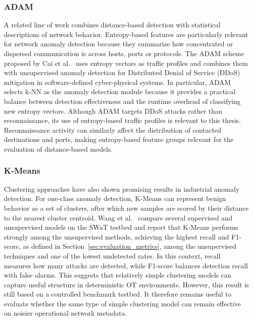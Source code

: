 \subsubsection{ADAM}
A related line of work combines distance-based detection with statistical descriptions of network behavior. Entropy-based features are particularly relevant for network anomaly detection because they summarize how concentrated or dispersed communication is across hosts, ports or protocols. The ADAM scheme proposed by Cai et al.~\cite{cai_adam_2023} uses entropy vectors as traffic profiles and combines them with unsupervised anomaly detection for Distributed Denial of Service (DDoS) mitigation in software-defined cyber-physical systems. In particular, ADAM selects k-NN as the anomaly detection module because it provides a practical balance between detection effectiveness and the runtime overhead of classifying new entropy vectors. Although ADAM targets DDoS attacks rather than reconnaissance, its use of entropy-based traffic profiles is relevant to this thesis. Reconnaissance activity can similarly affect the distribution of contacted destinations and ports, making entropy-based feature groups relevant for the evaluation of distance-based models.

\subsubsection{K-Means}
Clustering approaches have also shown promising results in industrial anomaly detection. For one-class anomaly detection, K-Means can represent benign behavior as a set of clusters, after which new samples are scored by their distance to the nearest cluster centroid. Wang et al.~\cite{wang_guardians_2026} compare several supervised and unsupervised models on the SWaT testbed and report that K-Means performs strongly among the unsupervised methods, achieving the highest recall and F1-score, as defined in Section~\ref{sec:evaluation_metrics}, among the unsupervised techniques and one of the lowest undetected rates. In this context, recall measures how many attacks are detected, while F1-score balances detection recall with false alarms. This suggests that relatively simple clustering models can capture useful structure in deterministic OT environments. However, this result is still based on a controlled benchmark testbed. It therefore remains useful to evaluate whether the same type of simple clustering model can remain effective on noisier operational network metadata.

